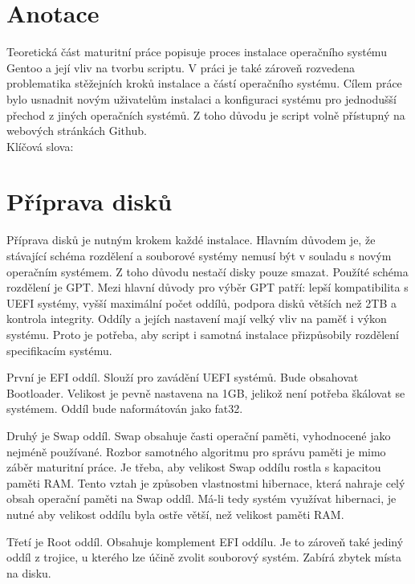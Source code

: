 \documentclass[12pt,a4paper,twoside,]{article}
\begin{document}
\newpage
\renewcommand{\contentsname}{\textsf{Obsah}}\tableofcontents

\newpage
\section{\textsf{Anotace}}
{Teoretická část maturitní práce popisuje proces instalace operačního systému Gentoo
	a její vliv na tvorbu scriptu. V práci je také zároveň rozvedena problematika stěžejních
	kroků instalace a částí operačního systému. Cílem práce bylo usnadnit novým uživatelům instalaci a konfiguraci
	systému pro jednodušší přechod z jiných operačních systémů. Z toho důvodu je script volně přístupný na webových stránkách Github. 
	\vspace{2cm}
	\\Klíčová slova:
}


\newpage

\section{\textsf{Příprava disků}}
{Příprava disků je nutným krokem každé instalace. Hlavním důvodem je, 
že stávající schéma rozdělení a souborové systémy nemusí být v souladu s novým operačním systémem. 
Z toho důvodu nestačí disky pouze smazat. Použíté schéma rozdělení je GPT. 
Mezi hlavní důvody pro výběr GPT patří: lepší kompatibilita s UEFI systémy, 
vyšší maximální počet oddílů, podpora disků větších než 2TB a kontrola integrity.
Oddíly a jejích nastavení mají velký vliv na paměť i výkon systému. Proto je potřeba, 
aby script i samotná instalace přizpůsobily rozdělení specifikacím systému.} 

{První je EFI oddíl. Slouží pro zavádění UEFI systémů. Bude obsahovat Bootloader. 
Velikost je pevně nastavena na 1GB, jelikož není potřeba škálovat se systémem.
Oddíl bude naformátován jako fat32.}

{Druhý je Swap oddíl. Swap obsahuje časti operační paměti, vyhodnocené jako nejméně používané. 
Rozbor samotného algoritmu pro správu paměti je mimo záběr maturitní práce. Je třeba,
aby velikost Swap oddílu rostla s kapacitou paměti RAM. Tento vztah je způsoben vlastnostmi hibernace, 
která nahraje celý obsah operační paměti na Swap oddíl. Má-li tedy systém využívat hibernaci, je nutné
aby velikost oddílu byla ostře větší, než velikost paměti RAM. }

{Třetí je Root oddíl. Obsahuje komplement EFI oddílu. Je to zároveň také jediný oddíl z trojice, 
u kterého lze účině zvolit souborový systém. Zabírá zbytek místa na disku.}
\end{document}
